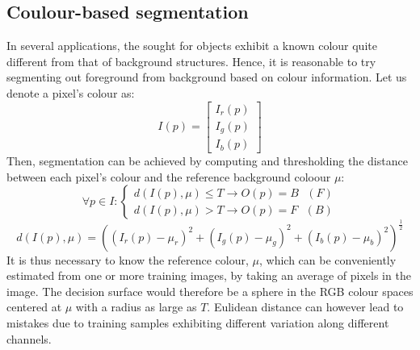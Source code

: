 \documentclass{article}
\begin{document}
\subsection{Coulour-based segmentation}
In several applications, the sought for objects exhibit a known colour quite different from that of background structures. Hence, it is reasonable to try segmenting out foreground from background based on colour information. Let us denote a pixel's colour as:
\[
    I(p)=\begin{bmatrix}
        I_r(p) \\
        I_g(p) \\
        I_b(p) 
    \end{bmatrix}
\]
Then, segmentation can be achieved by computing and thresholding the distance between each pixel's colour and the reference background coloour $\mu$:
\[
    \forall p \in I : \begin{cases}
        d(I(p),\mu)\leq T \rightarrow O(p) = B \text{ } (F)\\
        d(I(p),\mu) >T \rightarrow O(p) = F \text{ } (B)
    \end{cases}
\]
\[
    d(I(p),\mu) = ((I_r(p)-\mu_r)^2+(I_g(p)-\mu_g)^2+(I_b(p)-\mu_b)^2)^{\displaystyle\frac{1}{2}}
\]
It is thus necessary to know the reference colour, $\mu$, which can be conveniently estimated from one or more training images, by taking an average of pixels in the image. The decision surface would therefore be a sphere in the RGB colour spaces centered at $\mu$ with a radius as large as $T$. Eulidean distance can however lead to mistakes due to training samples exhibiting different variation along different channels.
\end{document}
